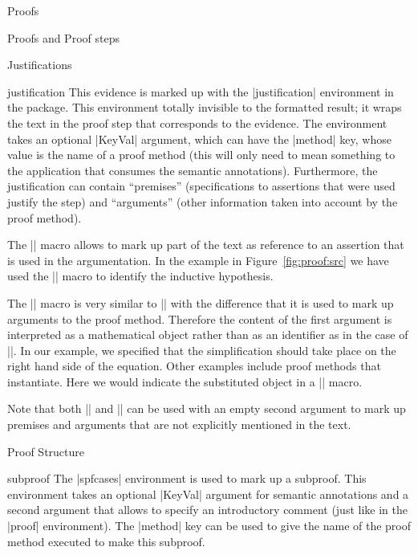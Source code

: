 \begin{sfragment}{Proofs}
\begin{sfragment}{Proofs and Proof steps}
\end{sfragment}

\begin{sfragment}{Justifications}

  \begin{environment}{justification}
    This evidence is marked up with the |justification| environment in the
     package. This environment totally invisible to the formatted result;
    it wraps the text in the proof step that corresponds to the evidence. The environment
    takes an optional |KeyVal| argument, which can have the |method| key, whose value is
    the name of a proof method (this will only need to mean something to the application
    that consumes the semantic annotations). Furthermore, the justification can contain
    ``premises'' (specifications to assertions that were used justify the step) and
    ``arguments'' (other information taken into account by the proof method).
  \end{environment}
  
  \begin{function}{\premise}
    The |\premise| macro allows to mark up part of the text as reference to an assertion
    that is used in the argumentation. In the example in Figure~\ref{fig:proof:src} we
    have used the |\premise| macro to identify the inductive hypothesis.
  \end{function}
  
  \begin{function}{\justarg}
    The |\justarg| macro is very similar to |\premise| with the difference that it is used
    to mark up arguments to the proof method. Therefore the content of the first argument
    is interpreted as a mathematical object rather than as an identifier as in the case of
    |\premise|. In our example, we specified that the simplification should take place on
    the right hand side of the equation. Other examples include proof methods that
    instantiate. Here we would indicate the substituted object in a |\justarg| macro.
  \end{function}

  Note that both |\premise| and |\justarg| can be used with an empty second argument to
  mark up premises and arguments that are not explicitly mentioned in the text.
\end{sfragment}

\begin{sfragment}{Proof Structure}

  \begin{environment}{subproof}
    The |spfcases| environment is used to mark up a subproof. This environment takes an
    optional |KeyVal| argument for semantic annotations and a second argument that allows
    to specify an introductory comment (just like in the |proof| environment). The
    |method| key can be used to give the name of the proof method
    executed to make this subproof.
  \end{environment}
  

\end{sfragment}
\end{sfragment}
